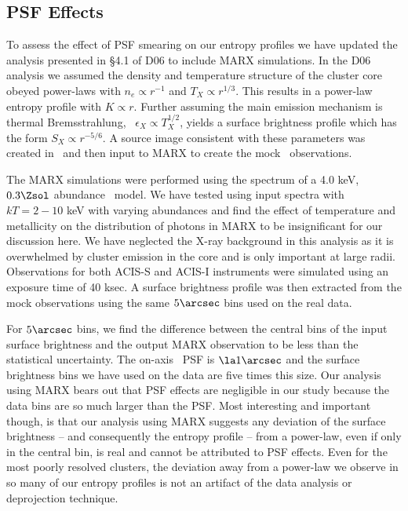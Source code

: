 \documentclass{emulateapj}
\begin{document}
\subsection{PSF Effects}
\label{sec:psf}

To assess the effect of PSF smearing on our entropy profiles we have
updated the analysis presented in \S4.1 of D06 to include MARX
simulations. In the D06 analysis we assumed the density and
temperature structure of the cluster core obeyed power-laws with $n_e
\propto r^{-1}$ and $T_X \propto r^{1/3}$. This results in a power-law
entropy profile with $K \propto r$. Further assuming the main emission
mechanism is thermal Bremsstrahlung, \ie\ $\epsilon_X \propto
T_X^{1/2}$, yields a surface brightness profile which has the form $S_X
\propto r^{-5/6}$. A source image consistent with these parameters was
created in \idl\ and then input to MARX to create the mock \chandra\
observations.

The MARX simulations were performed using the spectrum of a 4.0 keV,
$0.3 \Zsol$ abundance \mekal\ model. We have tested using input
spectra with $kT = 2-10$ keV with varying abundances and find the
effect of temperature and metallicity on the distribution of photons
in MARX to be insignificant for our discussion here. We have neglected
the X-ray background in this analysis as it is overwhelmed by cluster
emission in the core and is only important at large
radii. Observations for both ACIS-S and ACIS-I instruments were
simulated using an exposure time of 40 ksec. A surface brightness
profile was then extracted from the mock observations using the same
$5\arcsec$ bins used on the real data.

For $5\arcsec$ bins, we find the difference between the central bins
of the input surface brightness and the output MARX observation to be
less than the statistical uncertainty. The on-axis \chandra\ PSF is
$\la 1\arcsec$ and the surface brightness bins we have used on the
data are five times this size. Our analysis using MARX bears out that
PSF effects are negligible in our study because the data bins are so
much larger than the PSF. Most interesting and important though, is
that our analysis using MARX suggests any deviation of the surface
brightness -- and consequently the entropy profile -- from a
power-law, even if only in the central bin, is real and cannot be
attributed to PSF effects. Even for the most poorly resolved clusters,
the deviation away from a power-law we observe in so many of our
entropy profiles is not an artifact of the data analysis or
deprojection technique.
\end{document}
